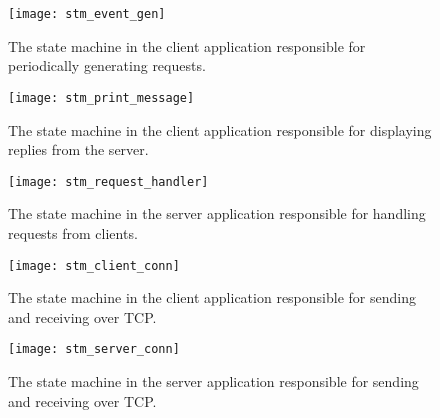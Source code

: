 \begin{appendices}
\begin{figure}[htp]
	\centering
	\begin{minipage}{0.45\linewidth}
		\texttt{[image: stm\_event\_gen]}
		\caption[Client \guillemotleft request-generator\guillemotright  state machine]{The state machine in the client application responsible for periodically generating requests.}
		\label{fig:stm_event_gen}
	\end{minipage}
	\quad
	\begin{minipage}{0.45\linewidth}
		\texttt{[image: stm\_print\_message]}
		\caption[Client \guillemotleft print reply\guillemotright state machine]{The state machine in the client application responsible for displaying replies from the server.}
		\label{fig:stm_print_message}
	\end{minipage}
\end{figure}

\begin{figure}[htp]
	\centering
	\texttt{[image: stm\_request\_handler]}
	\caption[Server \guillemotleft request-handler\guillemotright  state machine]{The state machine in the server application responsible for handling requests from clients.}
	\label{fig:stm_request_handler}
\end{figure}

\begin{figure}[htp]
	\centering
	\begin{minipage}{0.45\linewidth}
		\texttt{[image: stm\_client\_conn]}
		\caption[Client TCP-socket state machine]{The state machine in the client application responsible for sending and receiving over TCP.}
		\label{fig:stm_client_conn}
	\end{minipage}
	\quad
	\begin{minipage}{0.45\linewidth}
		\texttt{[image: stm\_server\_conn]}
		\caption[Server TCP-socket state machine]{The state machine in the server application responsible for sending and receiving over TCP.}
		\label{fig:stm_server_conn}
	\end{minipage}
\end{figure}

\end{appendices}